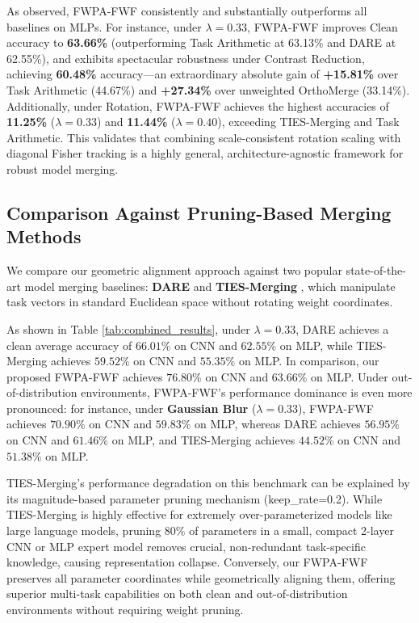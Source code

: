 \documentclass{article}
\theoremstyle{plain}
\theoremstyle{definition}
\theoremstyle{remark}
\begin{document}
As observed, FWPA-FWF consistently and substantially outperforms all baselines on MLPs. For instance, under $\lambda = 0.33$, FWPA-FWF improves Clean accuracy to \textbf{63.66\%} (outperforming Task Arithmetic at 63.13\% and DARE at 62.55\%), and exhibits spectacular robustness under Contrast Reduction, achieving \textbf{60.48\%} accuracy—an extraordinary absolute gain of \textbf{+15.81\%} over Task Arithmetic (44.67\%) and \textbf{+27.34\%} over unweighted OrthoMerge (33.14\%). Additionally, under Rotation, FWPA-FWF achieves the highest accuracies of \textbf{11.25\%} ($\lambda=0.33$) and \textbf{11.44\%} ($\lambda=0.40$), exceeding TIES-Merging and Task Arithmetic. This validates that combining scale-consistent rotation scaling with diagonal Fisher tracking is a highly general, architecture-agnostic framework for robust model merging.

\subsection{Comparison Against Pruning-Based Merging Methods}
We compare our geometric alignment approach against two popular state-of-the-art model merging baselines: \textbf{DARE} \cite{yu23} and \textbf{TIES-Merging} \cite{yadav23}, which manipulate task vectors in standard Euclidean space without rotating weight coordinates.

As shown in Table \ref{tab:combined_results}, under $\lambda=0.33$, DARE achieves a clean average accuracy of $66.01\%$ on CNN and $62.55\%$ on MLP, while TIES-Merging achieves $59.52\%$ on CNN and $55.35\%$ on MLP. In comparison, our proposed FWPA-FWF achieves $76.80\%$ on CNN and $63.66\%$ on MLP. Under out-of-distribution environments, FWPA-FWF's performance dominance is even more pronounced: for instance, under \textbf{Gaussian Blur} ($\lambda=0.33$), FWPA-FWF achieves $70.90\%$ on CNN and $59.83\%$ on MLP, whereas DARE achieves $56.95\%$ on CNN and $61.46\%$ on MLP, and TIES-Merging achieves $44.52\%$ on CNN and $51.38\%$ on MLP. 

TIES-Merging's performance degradation on this benchmark can be explained by its magnitude-based parameter pruning mechanism (keep\_rate=0.2). While TIES-Merging is highly effective for extremely over-parameterized models like large language models, pruning $80\%$ of parameters in a small, compact 2-layer CNN or MLP expert model removes crucial, non-redundant task-specific knowledge, causing representation collapse. Conversely, our FWPA-FWF preserves all parameter coordinates while geometrically aligning them, offering superior multi-task capabilities on both clean and out-of-distribution environments without requiring weight pruning.
\end{document}
